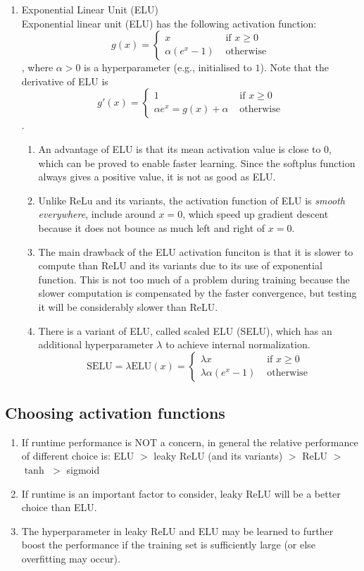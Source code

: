 \documentclass[11pt]{article}
\begin{document}
\begin{enumerate}
    \item Exponential Linear Unit (ELU)\\ Exponential linear unit (ELU) has the following activation function: $$g(x) = \begin{cases} x& \text{ if }x \geq 0 \\ \alpha (e^x -1) & \text{ otherwise}\end{cases}$$, where $\alpha > 0$ is a hyperparameter (e.g., initialised to $1$). Note that the derivative of ELU is $$g'(x) = \begin{cases} 1& \text{ if }x \geq 0 \\ \alpha e^x = g(x) + \alpha & \text{ otherwise}\end{cases}$$. 
    \begin{enumerate}
        \item An advantage of ELU is that its mean activation value is close to $0$, which can be proved to enable faster learning. Since the softplus function always gives a positive value, it is not as good as ELU.
        \item Unlike ReLu and its variants, the activation function of ELU is \emph{smooth everywhere}, include around $x = 0$, which speed up gradient descent because it does not bounce as much left and right of $x = 0$.
        \item The main drawback of the ELU activation funciton is that it is slower to compute than ReLU and its variants due to its use of exponential function. This is not too much of a problem during training because the slower computation is compensated by the faster convergence, but testing it will be considerably slower than ReLU.
        \item There is a variant of ELU, called scaled ELU (SELU), which has an additional hyperparameter $\lambda$ to achieve internal normalization. $$\text{SELU} = \lambda \text{ELU}(x) = \begin{cases} \lambda x& \text{ if }x \geq 0 \\ \lambda \alpha (e^x -1) & \text{ otherwise}\end{cases}$$
    \end{enumerate}
\end{enumerate}

\subsection{Choosing activation functions}
\begin{enumerate}
    \item If runtime performance is NOT a concern, in general the relative performance of different choice is: ELU $>$ leaky ReLU (and its variants) $>$ ReLU $>$ $\tanh$ $>$ sigmoid
    \item If runtime is an important factor to consider, leaky ReLU will be a better choice than ELU.
    \item The hyperparameter in leaky ReLU and ELU may be learned to further boost the performance if the training set is sufficiently large (or else overfitting may occur). 
\end{enumerate}
\end{document}
